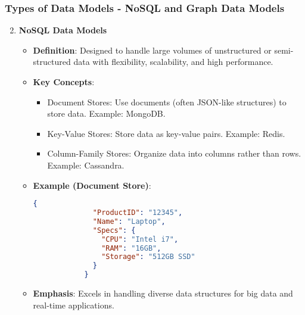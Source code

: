 \documentclass[aspectratio=169]{beamer}
\begin{document}
\begin{frame}[fragile]
    \frametitle{Types of Data Models - NoSQL and Graph Data Models}
    \begin{enumerate}
        \setcounter{enumi}{1}
        \item \textbf{NoSQL Data Models}
        \begin{itemize}
            \item \textbf{Definition}: Designed to handle large volumes of unstructured or semi-structured data with flexibility, scalability, and high performance.
            \item \textbf{Key Concepts}:
            \begin{itemize}
                \item Document Stores: Use documents (often JSON-like structures) to store data. Example: MongoDB.
                \item Key-Value Stores: Store data as key-value pairs. Example: Redis.
                \item Column-Family Stores: Organize data into columns rather than rows. Example: Cassandra.
            \end{itemize}
            \item \textbf{Example (Document Store)}:
            \begin{lstlisting}[language=json]
            {
              "ProductID": "12345",
              "Name": "Laptop",
              "Specs": {
                "CPU": "Intel i7",
                "RAM": "16GB",
                "Storage": "512GB SSD"
              }
            }
            \end{lstlisting}
            \item \textbf{Emphasis}: Excels in handling diverse data structures for big data and real-time applications.
        \end{itemize}
        

\end{enumerate}
\end{frame}
\end{document}
